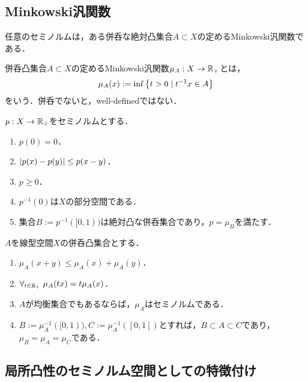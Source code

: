 \documentclass[uplatex,dvipdfmx]{jsreport}
\begin{document}
\subsection{Minkowski汎関数}

\begin{tcolorbox}[colframe=ForestGreen, colback=ForestGreen!10!white,breakable,colbacktitle=ForestGreen!40!white,coltitle=black,fonttitle=\bfseries\sffamily,
title=]
    任意のセミノルムは，ある併呑な絶対凸集合$A\subset X$の定めるMinkowski汎関数である．
\end{tcolorbox}

\begin{definition}
    併呑凸集合$A\subset X$の定めるMinkowski汎関数$\mu_A:X\to\mathbb{R}_+$とは，
    \[\mu_A(x):=\inf\left\{t>0\mid t^{-1}x\in A\right\}\]
    をいう．併呑でないと，well-definedではない．
\end{definition}

\begin{theorem}
    $p:X\to\mathbb{R}_+$をセミノルムとする．
    \begin{enumerate}
        \item $p(0)=0$．
        \item $\lvert p(x)-p(y)\rvert\le p(x-y)$．
        \item $p\ge0$．
        \item $p^{-1}(0)$は$X$の部分空間である．
        \item 集合$B:=p^{-1}([0,1))$は絶対凸な併呑集合であり，$p=\mu_B$を満たす．
    \end{enumerate}
\end{theorem}

\begin{theorem}
    $A$を線型空間$X$の併呑凸集合とする．
    \begin{enumerate}
        \item $\mu_A(x+y)\le\mu_A(x)+\mu_A(y)$．
        \item $\forall_{t\in\mathbb{R}_+}\;\mu_A(tx)=t\mu_A(x)$．
        \item $A$が均衡集合でもあるならば，$\mu_A$はセミノルムである．
        \item $B:=\mu_A^{-1}([0,1)),C:=\mu_A^{-1}([0,1])$とすれば，$B\subset A\subset C$であり，$\mu_B=\mu_A=\mu_C$である．
    \end{enumerate}
\end{theorem}

\subsection{局所凸性のセミノルム空間としての特徴付け}
\end{document}
